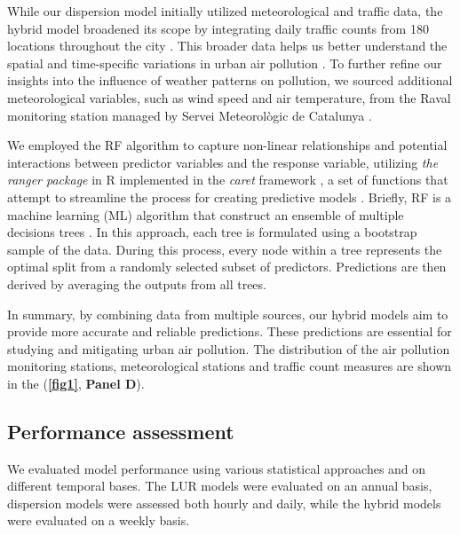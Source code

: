 \documentclass{article}
\begin{document}
While our dispersion model initially utilized meteorological and traffic data, the hybrid model broadened its scope by integrating daily traffic counts from 180 locations throughout the city \cite{trafficbcn}. This broader data helps us better understand the spatial and time-specific variations in urban air pollution \cite{pinto2020}. To further refine our insights into the influence of weather patterns on pollution, we sourced additional meteorological variables, such as wind speed and air temperature, from the Raval monitoring station managed by Servei Meteorològic de Catalunya \cite{xema2013}.

We employed the RF algorithm to capture non-linear relationships and potential interactions between predictor variables and the response variable, utilizing \textit{the ranger package} in R implemented in the \textit{caret} framework \cite{wright2019}, a set of functions that attempt to streamline the process for creating predictive models \cite{caret2008}. Briefly, RF is a machine learning (ML) algorithm that construct an ensemble of multiple decisions trees \cite{breiman2001}. In this approach, each tree is formulated using a bootstrap sample of the data. During this process, every node within a tree represents the optimal split from a randomly selected subset of predictors. Predictions are then derived by averaging the outputs from all trees.

In summary, by combining data from multiple sources, our hybrid models aim to provide more accurate and reliable predictions. These predictions are essential for studying and mitigating urban air pollution. The distribution of the air pollution monitoring stations, meteorological stations and traffic count measures are shown in the (\textbf{\cref{fig1}}, \textbf{Panel D}). 

\subsection{Performance assessment}

We evaluated model performance using various statistical approaches and on different temporal bases. The LUR models were evaluated on an annual basis, dispersion models were assessed both hourly and daily, while the hybrid models were evaluated on a weekly basis.
\end{document}
